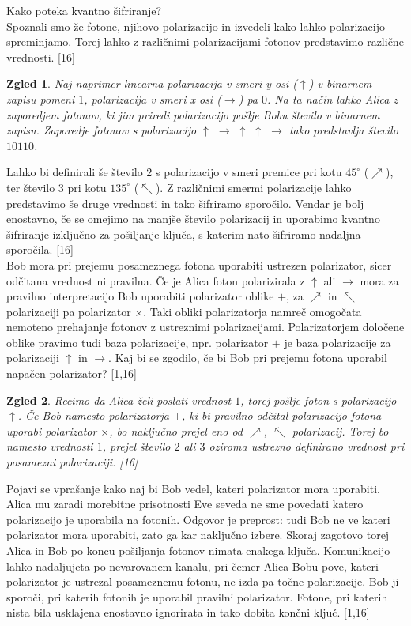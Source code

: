 \documentclass[A4paper, 11pt]{article}
\newtheorem{zgled}{Zgled}
\begin{document}
Kako poteka kvantno šifriranje?\\
Spoznali smo že fotone, njihovo polarizacijo in izvedeli kako lahko polarizacijo spreminjamo. Torej lahko z različnimi polarizacijami fotonov predstavimo različne vrednosti. [16]

\begin{zgled}
Naj naprimer linearna polarizacija v smeri y osi ($\uparrow$) v binarnem zapisu pomeni $1$, polarizacija v smeri x osi ($\rightarrow$) pa $0$. Na ta način lahko Alica z zaporedjem fotonov, ki jim priredi polarizacijo pošlje Bobu število v binarnem zapisu. Zaporedje fotonov s polarizacijo $\uparrow$ $\rightarrow$ $\uparrow$ $\uparrow$ $\rightarrow$ tako predstavlja število $1 0 1 1 0$.
\end{zgled}

Lahko bi definirali še število $2$ s polarizacijo v smeri premice pri kotu $45^{\circ}$ ($\nearrow$), ter število $3$ pri kotu $135^{\circ}$ ($\nwarrow$). Z različnimi smermi polarizacije lahko predstavimo še druge vrednosti in tako šifriramo sporočilo. Vendar je bolj enostavno, če se omejimo na manjše število polarizacij in uporabimo kvantno šifriranje izključno za pošiljanje ključa, s katerim nato šifriramo nadaljna sporočila. [16] \\

Bob mora pri prejemu posameznega fotona uporabiti ustrezen polarizator, sicer odčitana vrednost ni pravilna. Če je Alica foton polarizirala z $\uparrow$ ali $\rightarrow$ mora za pravilno interpretacijo Bob uporabiti polarizator oblike $+$, za $\nearrow$ in $\nwarrow$ polarizaciji pa polarizator $\times$. Taki obliki polarizatorja namreč omogočata nemoteno prehajanje fotonov z ustreznimi polarizacijami. Polarizatorjem določene oblike pravimo tudi baza polarizacije, npr. polarizator $+$ je baza polarizacije za polarizaciji $\uparrow$ in $\rightarrow$. Kaj bi se zgodilo, če bi Bob pri prejemu fotona uporabil napačen polarizator? [1,16]

\begin{zgled}
Recimo da Alica želi poslati vrednost $1$, torej pošlje foton s polarizacijo $\uparrow$. Če Bob namesto polarizatorja $+$, ki bi pravilno odčital polarizacijo fotona uporabi polarizator $\times$, bo naključno prejel eno od $\nearrow$, $\nwarrow$ polarizacij. Torej bo namesto vrednosti $1$, prejel število $2$ ali $3$ oziroma ustrezno definirano vrednost pri posamezni polarizaciji. [16]
\end{zgled}

Pojavi se vprašanje kako naj bi Bob vedel, kateri polarizator mora uporabiti. Alica mu zaradi morebitne prisotnosti Eve seveda ne sme povedati katero polarizacijo je uporabila na fotonih. Odgovor je preprost: tudi Bob ne ve kateri polarizator mora uporabiti, zato ga kar naključno izbere. Skoraj zagotovo torej Alica in Bob po koncu pošiljanja fotonov nimata enakega ključa. Komunikacijo lahko nadaljujeta po nevarovanem kanalu, pri čemer Alica Bobu pove, kateri polarizator je ustrezal posameznemu fotonu, ne izda pa točne polarizacije. Bob ji sporoči, pri katerih fotonih je uporabil pravilni polarizator. Fotone, pri katerih nista bila usklajena enostavno ignorirata in tako dobita končni ključ. [1,16] \\
\end{document}
